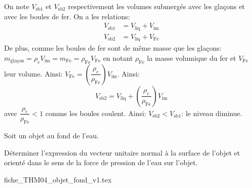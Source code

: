 \reponse{\reponseC{}}
\begin{corrige}
On note $V_{\text{sb1}}$ et $V_{\text{sb2}}$ respectivement les
volumes submergés avec les glaçons et avec les boules de fer. On a
les relations:
\begin{align*}
V_{\text{sb1}} & =V_{\text{liq}}+V_{\text{im}}\\
V_{\text{sb2}} & =V_{\text{liq}}+V_{\text{Fe}}
\end{align*}
 De plus, comme les boules de fer sont de même masse que les glaçons:
$m_{\text{glaçon}}=\rho_{e}V_{\text{im}}=m_{\text{Fe}}=\rho_{\text{Fe}}V_{\text{Fe}}$
en notant $\rho_{\text{Fe}}$ la masse volumique du fer et $V_{\text{Fe}}$
leur volume. Ainsi: $V_{\text{Fe}}=\left(\dfrac{\rho_{e}}{\rho_{\text{Fe}}}\right)V_{\text{im}}$.
Ainsi:
\[
V_{\text{sb2}}=V_{\text{liq}}+\left(\dfrac{\rho_{e}}{\rho_{\text{Fe}}}\right)V_{\text{im}}
\]
avec $\dfrac{\rho_{e}}{\rho_{\text{Fe}}}<1$ comme les boules coulent.
Ainsi: $V_{\text{sb2}}<V_{\text{sb1}}$: le niveau diminue.
\end{corrige}


\finEntrainement






\hauteurLargeurCadreReponse		{8mm}{1.5cm}
\initialisationEntrainement

Soit un objet au fond de l'eau. 

Déterminer l'expression du vecteur unitaire normal à la surface de l'objet et 
 orienté dans le sens de la force de pression de l'eau sur l'objet.


\begin{center}
{fiche_THM04_objet_fond_v1.tex}
\end{center}

